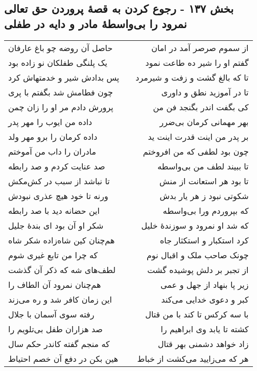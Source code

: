 \begin{center}
\section*{بخش ۱۳۷ - رجوع کردن به قصهٔ پروردن حق تعالی نمرود را بی‌واسطهٔ مادر و دایه در طفلی}
\label{sec:sh137}
\begin{longtable}{l p{0.5cm} r}
حاصل آن روضه چو باغ عارفان
&&
از سموم صرصر آمد در امان
\\
یک پلنگی طفلکان نو زاده بود
&&
گفتم او را شیر ده طاعت نمود
\\
پس بدادش شیر و خدمتهاش کرد
&&
تا که بالغ گشت و زفت و شیرمرد
\\
چون فطامش شد بگفتم با پری
&&
تا در آموزید نطق و داوری
\\
پرورش دادم مر او را زان چمن
&&
کی بگفت اندر بگنجد فن من
\\
داده من ایوب را مهر پدر
&&
بهر مهمانی کرمان بی‌ضرر
\\
داده کرمان را برو مهر ولد
&&
بر پدر من اینت قدرت اینت ید
\\
مادران را داب من آموختم
&&
چون بود لطفی که من افروختم
\\
صد عنایت کردم و صد رابطه
&&
تا ببیند لطف من بی‌واسطه
\\
تا نباشد از سبب در کش‌مکش
&&
تا بود هر استعانت از منش
\\
ورنه تا خود هیچ عذری نبودش
&&
شکوتی نبود ز هر یار بدش
\\
این حضانه دید با صد رابطه
&&
که بپروردم ورا بی‌واسطه
\\
شکر او آن بود ای بندهٔ جلیل
&&
که شد او نمرود و سوزندهٔ خلیل
\\
هم‌چنان کین شاه‌زاده شکر شاه
&&
کرد استکبار و استکثار جاه
\\
که چرا من تابع غیری شوم
&&
چونک صاحب ملک و اقبال نوم
\\
لطف‌های شه که ذکر آن گذشت
&&
از تجبر بر دلش پوشیده گشت
\\
هم‌چنان نمرود آن الطاف را
&&
زیر پا بنهاد از جهل و عمی
\\
این زمان کافر شد و ره می‌زند
&&
کبر و دعوی خدایی می‌کند
\\
رفته سوی آسمان با جلال
&&
با سه کرکس تا کند با من قتال
\\
صد هزاران طفل بی‌تلویم را
&&
کشته تا یابد وی ابراهیم را
\\
که منجم گفته کاندر حکم سال
&&
زاد خواهد دشمنی بهر قتال
\\
هین بکن در دفع آن خصم احتیاط
&&
هر که می‌زایید می‌کشت از خباط
\\

\end{longtable}
\end{center}
